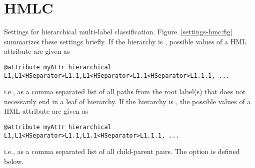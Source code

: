 \section{HMLC}
Settings for hierarchical multi-label classification. Figure~\ref{settings-hmc:fig} summarizes these settings briefly. If the hierarchy is ,
possible values of a HML attribute are given as
\begin{verbatim}
@attribute myAttr hierarchical L1,L1<HSeparator>L1.1,L1<HSeparator>L1.1<HSeparator>L1.1.1, ...
\end{verbatim}
i.e., as a comma separated list of all paths from the root label(s) that does not necessarily end in a leaf of hierarchy.
If the hierarchy is , the possible values of a HML attribute are given as
\begin{verbatim}
@attribute myAttr hierarchical L1,L1<HSeparator>L1.1,L1.1<HSeparator>L1.1.1, ...
\end{verbatim}
i.e., as a comma separated list of all child-parent pairs. The option  is defined below.

